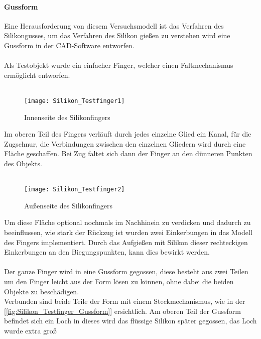 \documentclass[titlepage,12pt,twoside]{article}
\begin{document}
\paragraph{Gussform}
\label{par:Gussform}
\hfill \break
\hfill \break
Eine Herausforderung von diesem Versuchsmodell ist das Verfahren des Silikongusses, um das Verfahren des Silikon gießen zu verstehen wird eine Gussform in der CAD-Software entworfen. \\
\\
Als Testobjekt wurde ein einfacher Finger, welcher einen Faltmechanismus ermöglicht entworfen. \\
\\
\begin{figure}[H]
	\begin{center}
		\scalebox{0.8}
		{\texttt{[image: Silikon\_Testfinger1]}}
		\caption{Innenseite des Silikonfingers}
		\label{fig:Silikon_Testfinger1}			
	\end{center}
\end{figure}
\hfill \break
Im oberen Teil des Fingers verläuft durch jedes einzelne Glied ein Kanal, für die Zugschnur, die Verbindungen zwischen den einzelnen Gliedern wird durch eine Fläche geschaffen. Bei Zug faltet sich dann der Finger an den dünneren Punkten des Objekts. \\
\\
\begin{figure}[H]
	\begin{center}
		\scalebox{0.8}
		{\texttt{[image: Silikon\_Testfinger2]}}
		\caption{Außenseite des Silikonfingers}
		\label{fig:Silikon_Testfinger2}			
	\end{center}
\end{figure}
\hfill \break
Um diese Fläche optional nochmals im Nachhinein zu verdicken und dadurch zu beeinflussen, wie stark der Rückzug ist wurden zwei Einkerbungen in das Modell des Fingers implementiert. Durch das Aufgießen mit Silikon dieser rechteckigen Einkerbungen 
an den Biegungspunkten, kann dies bewirkt werden. \\
\\
Der ganze Finger wird in eine Gussform gegossen, diese besteht aus zwei Teilen um den Finger leicht aus der Form lösen zu können, ohne dabei die beiden Objekte zu beschädigen. \\
Verbunden sind beide Teile der Form mit einem Steckmechanismus, wie in der [\textcolor{blue}{\autoref{fig:Silikon_Testfinger_Gussform}}] ersichtlich. Am oberen Teil der Gussform befindet sich ein Loch in dieses wird das flüssige Silikon später gegossen, das Loch wurde extra groß 
\end{document}
